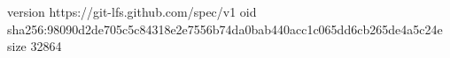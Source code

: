 version https://git-lfs.github.com/spec/v1
oid sha256:98090d2de705c5c84318e2e7556b74da0bab440acc1c065dd6cb265de4a5c24e
size 32864
